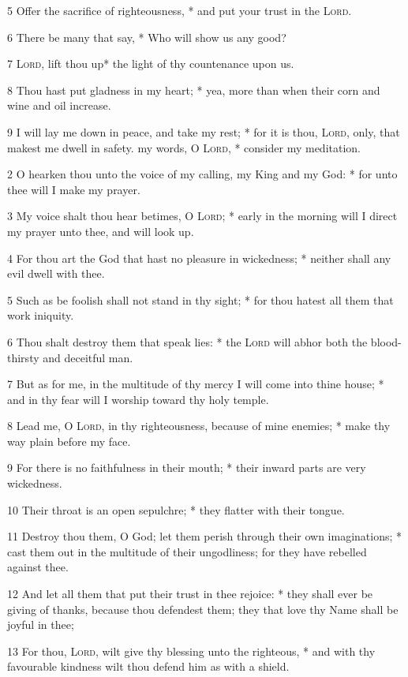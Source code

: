 5 Offer the sacrifice of righteousness, * and put your trust in the {\textsc{Lord}}.\par
6 There be many that say, * Who will show us any good?\par
7 {\textsc{Lord}}, lift thou up* the light of thy countenance upon us.\par
8 Thou hast put gladness in my heart; * yea, more than when their corn and wine and oil increase.\par
9 I will lay me down in peace, and take my rest; * for it is thou, {\textsc{Lord}}, only, that makest me dwell in safety.
 my words, O {\textsc{Lord}}, * consider my meditation.\par
2 O hearken thou unto the voice of my calling, my King and my God: * for unto thee will I make my prayer.\par
3 My voice shalt thou hear betimes, O {\textsc{Lord}}; * early in the morning will I direct my prayer unto thee, and will look up.\par
4 For thou art the God that hast no pleasure in wickedness; * neither shall any evil dwell with thee.\par
5 Such as be foolish shall not stand in thy sight; * for thou hatest all them that work iniquity.\par
6 Thou shalt destroy them that speak lies: * the {\textsc{Lord}} will abhor both the blood-thirsty and deceitful man.\par
7 But as for me, in the multitude of thy mercy I will come into thine house; * and in thy fear will I worship toward thy holy temple.\par
8 Lead me, O {\textsc{Lord}}, in thy righteousness, because of mine enemies; * make thy way plain before my face.\par
9 For there is no faithfulness in their mouth; * their inward parts are very wickedness.\par
10 Their throat is an open sepulchre; * they flatter with their tongue.\par
11 Destroy thou them, O God; let them perish through their own imaginations; * cast them out in the multitude of their ungodliness; for they have rebelled against thee.\par
12 And let all them that put their trust in thee rejoice: * they shall ever be giving of thanks, because thou defendest them; they that love thy Name shall be joyful in thee;\par
13 For thou, {\textsc{Lord}}, wilt give thy blessing unto the righteous, * and with thy favourable kindness wilt thou defend him as with a shield.
